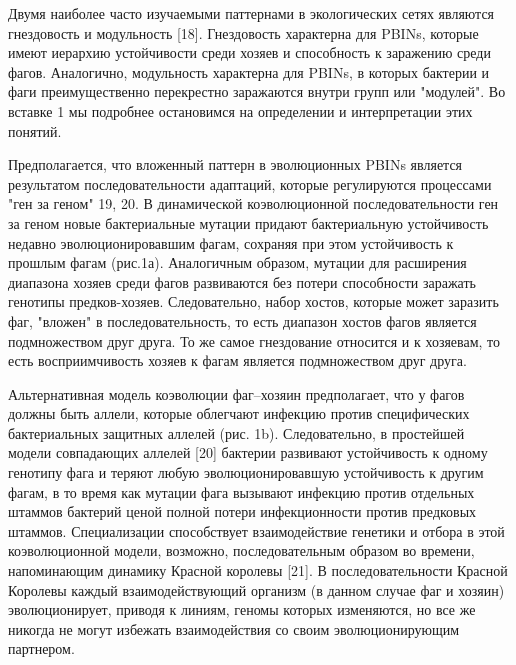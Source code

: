 \documentclass[a4paper,12pt]{article}
\begin{document}
    \par{Двумя наиболее часто изучаемыми паттернами в экологических сетях являются гнездовость и модульность [18].
    Гнездовость характерна для PBINs, которые имеют иерархию устойчивости среди хозяев и способность к заражению среди
    фагов. Аналогично, модульность характерна для PBINs, в которых бактерии и фаги преимущественно перекрестно
    заражаются внутри групп или "модулей". Во вставке 1 мы подробнее остановимся на определении и интерпретации этих
    понятий.}
    
    \par{Предполагается, что вложенный паттерн в эволюционных PBINs является результатом последовательности адаптаций,
    которые регулируются процессами "ген за геном" 19, 20. В динамической коэволюционной последовательности ген за
    геном новые бактериальные мутации придают бактериальную устойчивость недавно эволюционировавшим фагам, сохраняя при
    этом устойчивость к прошлым фагам (рис.1а). Аналогичным образом, мутации для расширения диапазона хозяев среди 
    фагов развиваются без потери способности заражать генотипы предков-хозяев. Следовательно, набор хостов, которые
    может заразить фаг, "вложен" в последовательность, то есть диапазон хостов фагов является подмножеством друг друга.
    То же самое гнездование относится и к хозяевам, то есть восприимчивость хозяев к фагам является подмножеством друг 
    друга.}
    
    \par{Альтернативная модель коэволюции фаг–хозяин предполагает, что у фагов должны быть аллели, которые облегчают 
    инфекцию против специфических бактериальных защитных аллелей (рис. 1b). Следовательно, в простейшей модели 
    совпадающих аллелей [20] бактерии развивают устойчивость к одному генотипу фага и теряют любую эволюционировавшую 
    устойчивость к другим фагам, в то время как мутации фага вызывают инфекцию против отдельных штаммов бактерий ценой 
    полной потери инфекционности против предковых штаммов. Специализации способствует взаимодействие генетики и отбора 
    в этой коэволюционной модели, возможно, последовательным образом во времени, напоминающим динамику Красной королевы
    [21]. В последовательности Красной Королевы каждый взаимодействующий организм (в данном случае фаг и хозяин) 
    эволюционирует, приводя к линиям, геномы которых изменяются, но все же никогда не могут избежать взаимодействия со 
    своим эволюционирующим партнером.}
    
\end{document}
